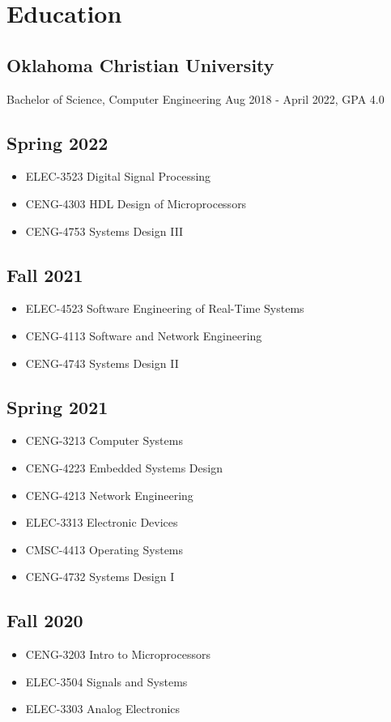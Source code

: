 \documentclass{article}
\begin{document}
\section{Education}
	\subsection{Oklahoma Christian University}
		Bachelor of Science, Computer Engineering Aug 2018 - April 2022, GPA 4.0
		\subsection{Spring 2022}
			\begin{itemize}
				\item ELEC-3523 Digital Signal Processing
				\item CENG-4303 HDL Design of Microprocessors
				\item CENG-4753 Systems Design III
			\end{itemize}
		\subsection{Fall 2021}
			\begin{itemize}
				\item ELEC-4523 Software Engineering of Real-Time Systems
				\item CENG-4113 Software and Network Engineering
				\item CENG-4743 Systems Design II
			\end{itemize}
		\subsection{Spring 2021}
			\begin{itemize}
				\item CENG-3213 Computer Systems
				\item CENG-4223 Embedded Systems Design
				\item CENG-4213 Network Engineering
				\item ELEC-3313 Electronic Devices
				\item CMSC-4413 Operating Systems
				\item CENG-4732 Systems Design I
			\end{itemize}
		\subsection{Fall 2020}
			\begin{itemize}
				\item CENG-3203 Intro to Microprocessors
				\item ELEC-3504 Signals and Systems
				\item ELEC-3303 Analog Electronics
			\end{itemize}
\end{document}
